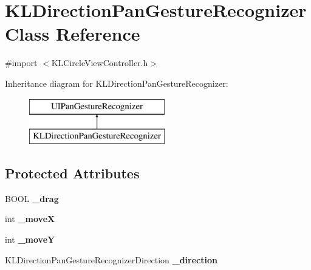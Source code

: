 \hypertarget{interface_k_l_direction_pan_gesture_recognizer}{\section{K\-L\-Direction\-Pan\-Gesture\-Recognizer Class Reference}
\label{interface_k_l_direction_pan_gesture_recognizer}
}


{\ttfamily \#import $<$K\-L\-Circle\-View\-Controller.\-h$>$}

Inheritance diagram for K\-L\-Direction\-Pan\-Gesture\-Recognizer\-:\begin{figure}[H]
\begin{center}
\leavevmode
\includegraphics[height=2.000000cm]{interface_k_l_direction_pan_gesture_recognizer}
\end{center}
\end{figure}
\subsection*{Protected Attributes}
\begin{DoxyCompactItemize}
\item 
\hypertarget{interface_k_l_direction_pan_gesture_recognizer_aec1ef938c7750bdcd5b17a46b16930ec}{B\-O\-O\-L {\bfseries \-\_\-drag}}\label{interface_k_l_direction_pan_gesture_recognizer_aec1ef938c7750bdcd5b17a46b16930ec}

\item 
\hypertarget{interface_k_l_direction_pan_gesture_recognizer_ad7c446b8c333a07bac5d8654b6afe7dc}{int {\bfseries \-\_\-move\-X}}\label{interface_k_l_direction_pan_gesture_recognizer_ad7c446b8c333a07bac5d8654b6afe7dc}

\item 
\hypertarget{interface_k_l_direction_pan_gesture_recognizer_a5a1c5e2d22bdb99ce82dcfa0d94b1741}{int {\bfseries \-\_\-move\-Y}}\label{interface_k_l_direction_pan_gesture_recognizer_a5a1c5e2d22bdb99ce82dcfa0d94b1741}

\item 
\hypertarget{interface_k_l_direction_pan_gesture_recognizer_a55cc6a065b15185d590ed60fa78cd319}{K\-L\-Direction\-Pan\-Gesture\-Recognizer\-Direction {\bfseries \-\_\-direction}}\label{interface_k_l_direction_pan_gesture_recognizer_a55cc6a065b15185d590ed60fa78cd319}

\end{DoxyCompactItemize}
